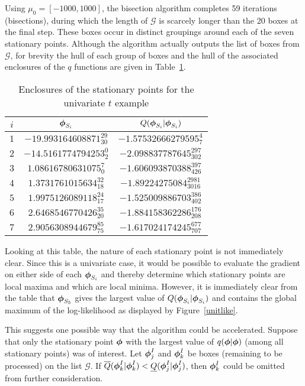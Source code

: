 \documentclass[10pt,twoside]{article}
\begin{document}
Using $\mu_0 = [-1000,1000]$, the bisection algorithm completes 59
iterations (bisections), during which the length of $\mathcal{G}$ is
scarcely longer than the 20 boxes at the final step.  
These boxes occur in distinct groupings
around each of the seven stationary points.  Although the algorithm
actually outputs the list of boxes from $\mathcal{G}$, for brevity the hull
of each group of boxes and the hull of the associated enclosures of
the $q$ functions are given in Table~\ref{unit:table}.
\renewcommand{\arraystretch}{1.4}
\begin{table}[!ht]
\caption{\sffamily Enclosures of the stationary points for the univariate $t$
example \label{unit:table}}
\begin{center}
\begin{tabular}{ccc}
\hline\hline
$i$ & $\mbox{\boldmath $\phi$}_{S_i}$ & $Q(\mbox{\boldmath $\phi$}_{S_i}|\mbox{\boldmath $\phi$}_{S_i})$ \\ \hline
$1$ & $ -19.993164608871_{30}^{29} $  & $ -1.57532666279595_{7}^{4} $ \\
$2$ & $ -14.5161774794253_{2}^{0} $  & $ -2.098837787645_{302}^{297} $ \\
$3$ & $ 1.08616780631075_{0}^{7} $  & $ -1.606093870388_{426}^{397} $ \\
$4$ & $ 1.3731761015634_{18}^{32} $  & $ -1.89224275084_{3016}^{2981} $ \\
$5$ & $ 1.9975126089118_{17}^{24} $  & $ -1.525009886703_{402}^{386} $ \\
$6$ & $ 2.6468546770426_{20}^{35} $  & $ -1.884158362286_{208}^{176} $ \\
$7$ & $ 2.9056308944679_{75}^{85} $  & $ -1.617024174245_{707}^{677} $ \\ 
\hline
\end{tabular}
\end{center}
\end{table}
\renewcommand{\arraystretch}{1.00}

Looking at this table, the nature of each stationary point is not
immediately clear.  Since this is a univariate case, it would be
possible to evaluate the gradient on either side of each
$\mbox{\boldmath $\phi$}_{S_i}$ and thereby determine which stationary points are
local maxima and which are local minima.  However, it is immediately clear
from the table that $\mbox{\boldmath $\phi$}_{S_5}$ gives the largest value of 
$Q(\mbox{\boldmath $\phi$}_{S_i}|\mbox{\boldmath $\phi$}_{S_i})$ and contains the global maximum of the
log-likelihood as displayed by Figure~\ref{unitlike}.

This suggests one possible way that the algorithm could be accelerated.
Suppose that only the stationary point $\mbox{\boldmath $\phi$}$ with the largest value of 
$q(\mbox{\boldmath $\phi$}|\mbox{\boldmath $\phi$})$ (among all stationary points) was of interest.  Let
$\mbox{\boldmath $\phi$}_j^I$ and $\mbox{\boldmath $\phi$}_k^I$ be boxes (remaining to be processed) on the
list
$\mathcal{G}$.
If $\overline{Q}(\mbox{\boldmath $\phi$}_k^I | \mbox{\boldmath $\phi$}_k^I) < 
  \underline{Q}(\mbox{\boldmath $\phi$}_j^I | \mbox{\boldmath $\phi$}_j^I)$, then $\mbox{\boldmath $\phi$}_k^I$ could be
omitted
from further consideration.
\end{document}
